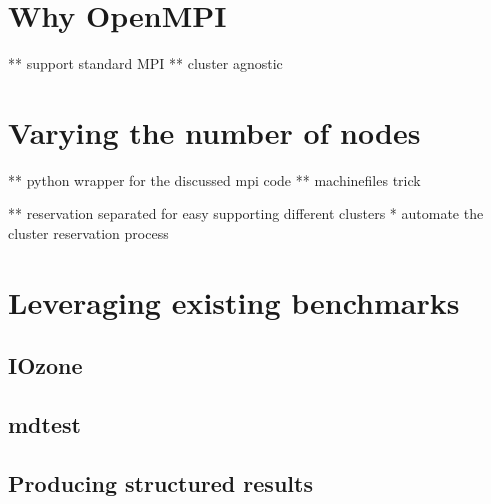 


\section{Why OpenMPI}

** support standard MPI
** cluster agnostic


\section{Varying the number of nodes}

** python wrapper for the discussed mpi code
** machinefiles trick


** reservation separated for easy supporting different clusters
* automate the cluster reservation process


\section{Leveraging existing benchmarks}


\subsection{IOzone}


\subsection{mdtest}





\subsection{Producing structured results}



